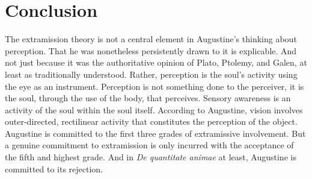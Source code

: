 \documentclass[12pt]{article}
\begin{document}


\section{Conclusion} %
\label{sec:conclusion}

The extramission theory is not a central element in Augustine’s thinking about perception. That he was nonetheless persistently drawn to it is explicable. And not just because it was the authoritative opinion of Plato, Ptolemy, and Galen, at least as traditionally understood. Rather, perception is the soul’s activity using the eye as an instrument. Perception is not something done to the perceiver, it is the soul, through the use of the body, that perceives. Sensory awareness is an activity of the soul within the soul itself. According to Augustine, vision involves outer-directed, rectilinear activity that constitutes the perception of the object. Augustine is committed to the first three grades of extramissive involvement. But a genuine commitment to extramission is only incurred with the acceptance of the fifth and highest grade. And in \emph{De quantitate animae} at least, Augustine is committed to its rejection.






\nocite{Tourscher:1933rw}
\nocite{Dodds:1963ul}
\nocite{Migne:1845aa}
\nocite{Migne:1856aa}
\nocite{Lacy:1980mk}
\nocite{Castellote:1978qe}
\nocite{Sorabji:1997ly}
\nocite{Guagliardo:1996aa}



\end{document}
